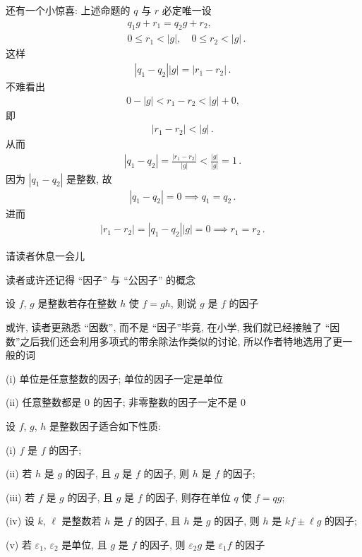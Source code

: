 还有一个小惊喜: 上述命题的 $q$ 与 $r$ 必定唯一\period 设
\begin{align*}
     & q_1 g + r_1 = q_2 g + r_2,                       \\
     & 0 \leq r_1 < |g|, \quad 0 \leq r_2 < |g| \period
\end{align*}
这样
\begin{align*}
    |q_1 - q_2| |g| = |r_1 - r_2| \period
\end{align*}
不难看出
\begin{align*}
    0 - |g| < r_1 - r_2 < |g| + 0,
\end{align*}
即
\begin{align*}
    |r_1 - r_2| < |g| \period
\end{align*}
从而
\begin{align*}
    |q_1 - q_2| = \frac{|r_1 - r_2|}{|g|} < \frac{|g|}{|g|} = 1 \period
\end{align*}
因为 $|q_1 - q_2|$ 是整数, 故
\begin{align*}
    |q_1 - q_2| = 0 \implies q_1 = q_2 \period
\end{align*}
进而
\begin{align*}
    |r_1 - r_2| = |q_1 - q_2| |g| = 0 \implies r_1 = r_2 \period
\end{align*}

请读者休息一会儿\period

\myLine

读者或许还记得 ``因子'' 与 ``公因子'' 的概念\period
\begin{definition}
    设 $f$, $g$ 是整数\period 若存在整数 $h$ 使 $f=gh$, 则说 $g$ 是 $f$ 的因子 \period
\end{definition}

\begin{remark}
    或许, 读者更熟悉 ``因数'', 而不是 ``因子''\period 毕竟, 在小学, 我们就已经接触了 ``因数''\period 之后我们还会利用多项式的带余除法作类似的讨论, 所以作者特地选用了更一般的词\period
\end{remark}

\begin{example}
    (i) 单位是任意整数的因子; 单位的因子一定是单位\period

    (ii) 任意整数都是 $0$ 的因子; 非零整数的因子一定不是 $0$\period
\end{example}

\begin{proposition}
    设 $f$, $g$, $h$ 是整数\period 因子适合如下性质:

    (i) $f$ 是 $f$ 的因子;

    (ii) 若 $h$ 是 $g$ 的因子, 且 $g$ 是 $f$ 的因子, 则 $h$ 是 $f$ 的因子;

    (iii) 若 $f$ 是 $g$ 的因子, 且 $g$ 是 $f$ 的因子, 则存在单位 $q$ 使 $f = qg$;

    (iv) 设 $k$, $\ell$ 是整数\period 若 $h$ 是 $f$ 的因子, 且 $h$ 是 $g$ 的因子, 则 $h$ 是 $kf \pm \ell g$ 的因子;

    (v) 若 $\varepsilon_1$, $\varepsilon_2$ 是单位, 且 $g$ 是 $f$ 的因子, 则 $\varepsilon_2 g$ 是 $\varepsilon_1 f$ 的因子\period
\end{proposition}


